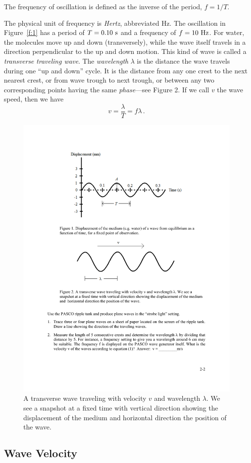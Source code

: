\documentclass[11pt]{NSF}
\def\be{\begin{equation}}
\def\ee{\end{equation}}
\begin{document}
The frequency of oscillation is defined as the inverse of the period,
$f=1/T$.

The physical unit of frequency is {\em Hertz}, abbreviated Hz. 
The oscillation in Figure~\ref{f:1} 
has a period of $T = 0.10~{\rm s}$ and a frequency of $f = 10~{\rm Hz}$. 
For water, the molecules move up and down (transversely), while the wave 
itself travels in a direction perpendicular to the up and down motion. 
This kind of wave is called a {\em transverse traveling wave}. 
The {\em wavelength} $\lambda$ is the distance the wave travels 
during one ``up and down” cycle. 
It is the distance from any one crest
to the next nearest crest, or from wave trough to next trough, or between any
two corresponding points having the same {\em phase}---see Figure 2. 
If we call $v$ the wave speed, then we have
\be
v = \frac{\lambda}{T} = f\lambda\,.
\label{e:v=f*lambda}
\ee
%
\begin{figure}[hbtp]
\begin{center}
\includegraphics[width=.6\textwidth]{fig2_2}
\caption{A transverse wave traveling with velocity $v$ and wavelength 
$\lambda$. 
We see a snapshot at a fixed time with vertical direction 
showing the displacement of
the medium and horizontal direction the position of the wave.}
\label{f:2}
\end{center}
\end{figure}
%

\subsection{Wave Velocity}
\end{document}
